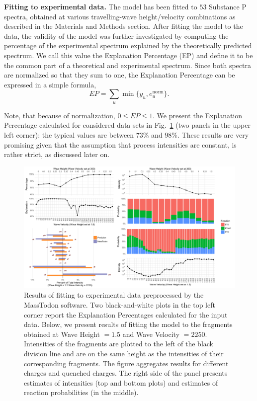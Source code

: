 \documentclass{llncs}
\begin{document}
        \textbf{Fitting to experimental data.} The model has been fitted to $53$ Substance P spectra, obtained at various travelling-wave height/velocity combinations as described in the Materials and Methods section. After fitting the model to the data, the validity of the model was further investigated by computing the percentage of the experimental spectrum explained by the theoretically predicted spectrum. We call this value the Explanation Percentage (EP) and define it to be the common part of a theoretical and experimental spectrum. Since both spectra are normalized so that they sum to one, the Explanation Percentage can be expressed in a simple formula,
        $$ EP = \sum_u \min\{y_u, e_u^\text{norm}\}.$$

        Note, that because of normalization, $0 \leq EP \leq 1$. We present the Explanation Percentage calculated for considered data sets in Fig.~\ref{fig::melon} (two panels in the upper left corner): the typical values are between $73\%$ and $98\%$. These results are very promising given that the assumption that process intensities are constant, is rather strict, as discussed later on.

        \begin{figure}[h]
                \center
                \includegraphics[width=.8\textwidth]{melon.png}
                \caption{ Results of fitting to experimental data preprocessed by the MassTodon software. Two black-and-white plots in the top left corner report the Explanation Percentages calculated for the input data. Below, we present results of fitting the model to the fragments obtained at Wave Height $= 1.5$ and Wave Velocity $= 2250$. Intensities of the  fragments are plotted to the left of the black division line and are on the same height as the intensities of their corresponding  fragments. The figure aggregates results for different charges and quenched charges. The right side of the panel presents estimates of intensities (top and bottom plots) and estimates of reaction probabilities (in the middle).
                }\label{fig::melon}
        \end{figure}
\end{document}
